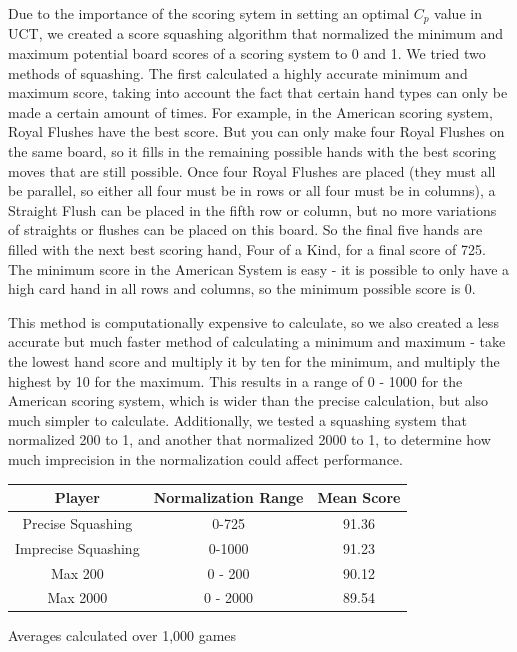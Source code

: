 \documentclass[letterpaper]{article}
\begin{document}
Due to the importance of the scoring sytem in setting an optimal  $C_p$ value in UCT, we created a score squashing algorithm that normalized the minimum and maximum potential board scores of a scoring system to 0 and 1. We tried two methods of squashing. The first calculated a highly accurate minimum and maximum score, taking into account the fact that certain hand types can only be made a certain amount of times. For example, in the American scoring system, Royal Flushes have the best score. But you can only make four Royal Flushes on the same board, so it fills in the remaining possible hands with the best scoring moves that are still possible. Once four Royal Flushes are placed (they must all be parallel, so either all four must be in rows or all four must be in columns), a Straight Flush can be placed in the fifth row or column, but no more variations of straights or flushes can be placed on this board. So the final five hands are filled with the next best scoring hand, Four of a Kind, for a final score of 725. The minimum score in the American System is easy - it is possible to only have a high card hand in all rows and columns, so the minimum possible score is 0. 

This method is computationally expensive to calculate, so we also created a less accurate but much faster method of calculating a minimum and maximum - take the lowest hand score and multiply it by ten for the minimum, and multiply the highest by 10 for the maximum. This results in a range of 0 - 1000 for the American scoring system, which is wider than the precise calculation, but also much simpler to calculate. Additionally, we tested a squashing system that normalized 200 to 1, and another that normalized 2000 to 1, to determine how much imprecision in the normalization could affect performance. 

\begin{minipage}{\linewidth}
\centering
\label{tbl:SquashingTable}
\begin{tabular}{c c c}
\hline
Player & Normalization Range & Mean Score \\
\hline
Precise Squashing & 0-725 & 91.36 \\
Imprecise Squashing & 0-1000 & 91.23 \\
Max 200 & 0 - 200 & 90.12 \\
Max 2000 & 0 - 2000 & 89.54 \\
\hline
\end{tabular}\par
\bigskip
Averages calculated over 1,000 games
\end{minipage}
\end{document}
